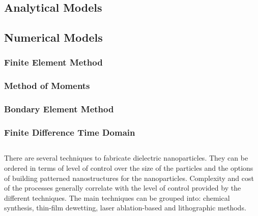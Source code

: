    \subsection{Analytical Models}
        \subsubsection{}
        \subsubsection{}
        
    \subsection{Numerical Models}
        \subsubsection{}
        \subsubsection{Finite Element Method}
        \subsubsection{Method of Moments}
        \subsubsection{Bondary Element Method}
        \subsubsection{}
        \subsubsection{Finite Difference Time Domain}

    \subsection{}
            There are several techniques to fabricate dielectric nanoparticles. They can be ordered in terms of level of control over the size
        of the particles and the options of building patterned nanostructures for the nanoparticles. Complexity and cost of the processes generally
        correlate with the level of control provided by the different techniques.
            The main techniques can be grouped into: chemical synthesis\cite{shi2012new}, thin-film dewetting\cite{abbarchi2014wafer},
        laser ablation-based\cite{zywietz2014laser} and lithographic methods.


